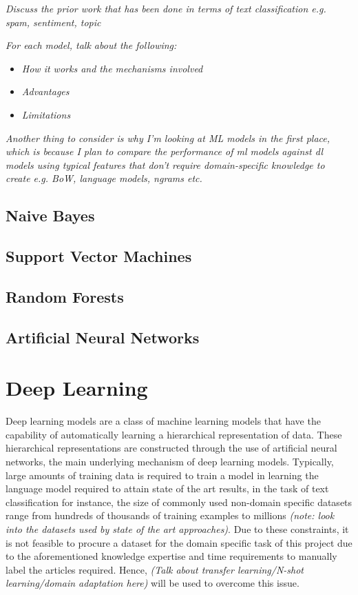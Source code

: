\documentclass[a4paper,twoside,phd]{BYUPhys}
\begin{document}
\textit{Discuss the prior work that has been done in terms of text classification e.g. spam, sentiment, topic}


\textit{For each model, talk about the following:}
\begin{itemize}
	\item \textit{How it works and the mechanisms involved}
	\item \textit{Advantages}
	\item \textit{Limitations}
\end{itemize}

\textit{Another thing to consider is why I'm looking at ML models in the first place, which is because I plan to compare the performance of ml models against dl models using typical features that don't require domain-specific knowledge to create e.g. BoW, language models, ngrams etc.}

\subsection{Naive Bayes}
\label{sec:NaiveBayes}

\subsection{Support Vector Machines}
\label{sec:SVM}

\subsection{Random Forests}

\subsection{Artificial Neural Networks}
\label{sec:ANN}


\section{Deep Learning}
\label{sec:DeepLearningReview}

Deep learning models are a class of machine learning models that have the capability of automatically learning a hierarchical representation of data. These hierarchical representations are constructed through the use of artificial neural networks, the main underlying mechanism of deep learning models. Typically, large amounts of training data is required to train a model in learning the language model required to attain state of the art results, in the task of text classification for instance, the size of commonly used non-domain specific datasets range from hundreds of thousands of training examples to millions \cite{Conneau2017} \cite{Zhang} \textit{(note: look into the datasets used by state of the art approaches)}. Due to these constraints, it is not feasible to procure a dataset for the domain specific task of this project due to the aforementioned knowledge expertise and time requirements to manually label the articles required. Hence, \textit{(Talk about transfer learning/N-shot learning/domain adaptation here)} will be used to overcome this issue.
\end{document}
